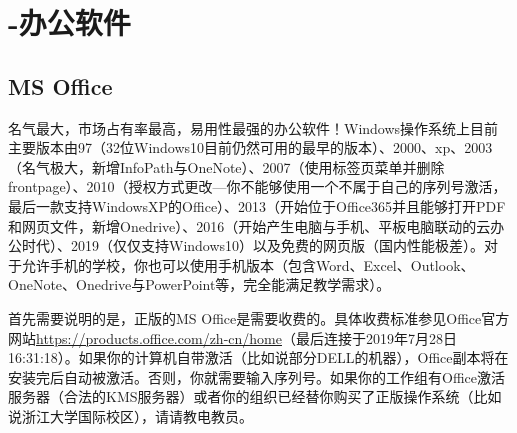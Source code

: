 \section{-办公软件}
\subsection{MS Office}
名气最大，市场占有率最高，易用性最强的办公软件！Windows操作系统上目前主要版本由97（32位Windows10目前仍然可用的最早的版本）、2000、xp、2003（名气极大，新增InfoPath与OneNote）、2007（使用标签页菜单并删除frontpage）、2010（授权方式更改—你不能够使用一个不属于自己的序列号激活，最后一款支持WindowsXP的Office）、2013（开始位于Office365并且能够打开PDF和网页文件，新增Onedrive）、2016（开始产生电脑与手机、平板电脑联动的云办公时代）、2019（仅仅支持Windows10）以及免费的网页版（国内性能极差）。对于允许手机的学校，你也可以使用手机版本（包含Word、Excel、Outlook、OneNote、Onedrive与PowerPoint等，完全能满足教学需求）。\par
首先需要说明的是，正版的MS Office是需要收费的。具体收费标准参见Office官方网站\url{https://products.office.com/zh-cn/home}（最后连接于2019年7月28日16:31:18）。如果你的计算机自带激活（比如说部分DELL的机器），Office副本将在安装完后自动被激活。否则，你就需要输入序列号。如果你的工作组有Office激活服务器（合法的KMS服务器）或者你的组织已经替你购买了正版操作系统（比如说浙江大学国际校区），请请教电教员。
